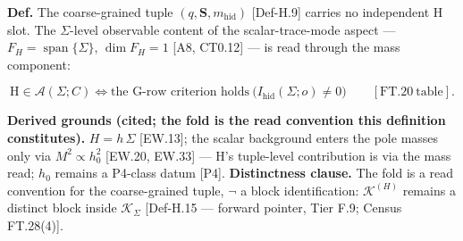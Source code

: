 \begin{definition}\label{tag:Def-H-36}
\textbf{Def.} The coarse-grained tuple $(q,\mathbf S,m_{\mathrm{hid}})$ [Def-H.9] carries no independent H slot. The $\Sigma$-level observable content of the scalar-trace-mode aspect — $F_H=\operatorname{span}\{\Sigma\}$, $\dim F_H=1$ [A8, CT0.12] — is read through the mass component:

\[
\mathrm H\in\mathcal A(\Sigma;C)\iff\text{the G-row criterion holds}\ \bigl(I_{\mathrm{hid}}(\Sigma;o)\ne0\bigr)\qquad[\mathrm{FT.20}\ \text{table}].
\]

\textbf{Derived grounds (cited; the fold is the read convention this definition constitutes).} $H=h\,\Sigma$ [EW.13]; the scalar background enters the pole masses only via $M^2\propto h_0^2$ [EW.20, EW.33] — H's tuple-level contribution is via the mass read; $h_0$ remains a P4-class datum [P4]. \textbf{Distinctness clause.} The fold is a read convention for the coarse-grained tuple, $\neg$ a block identification: $\mathcal K^{(H)}$ remains a distinct block inside $\mathcal K_\Sigma$ [Def-H.15 — forward pointer, Tier F.9; Census FT.28(4)].

\end{definition}

